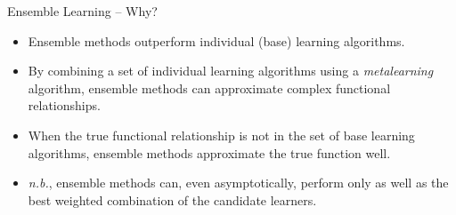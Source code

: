 \documentclass[12pt,t]{beamer}
\begin{document}
\begin{frame}[c]{Ensemble Learning -- Why?}

\vspace*{3mm}

\centering

  \begin{itemize}
    \itemsep12pt
    \item Ensemble methods outperform individual (base) learning algorithms.
    \item By combining a set of individual learning algorithms using a
          \textit{metalearning} algorithm, ensemble methods can approximate
          complex functional relationships.
    \item When the true functional relationship is not in the set of base
          learning algorithms, ensemble methods approximate the true function
          well.
    \item \textit{n.b.}, ensemble methods can, even asymptotically, perform only
          as well as the best weighted combination of the candidate learners.
  \end{itemize}
\end{frame}
\end{document}
